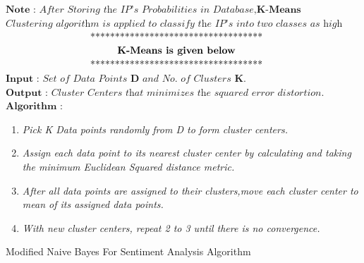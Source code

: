 \documentclass{article}
\begin{document}
\begin{algorithm}[H]
\begin{algorithmic}[1]
\State $\textbf{Note : }\textit{After Storing the IP's Probabilities in Database,}\textbf{K-Means} $ $\textit{Clustering algorithm is applied to classify the IP's into two classes as high and Low.}$
 $\centerline{***********************************}$
 $\textbf{\centerline{K-Means is given below}}$
 $\centerline{***********************************}$
\State $\textbf{Input : }\textit{Set of Data Points }\textbf{D}\textit{ and No. of Clusters}\textbf{ K.}$
\State $\textbf{Output : }\textit{Cluster Centers that minimizes the squared error distortion.}$
\State $\textbf{Algorithm : }$
\begin{enumerate}
   \item \textit{Pick K Data points randomly from D to form cluster centers.}
   \item \textit{Assign each data point to its nearest cluster center by calculating and taking the minimum Euclidean Squared distance metric.}
   \item \textit{After all data points are assigned to their clusters,move each cluster center to mean of its assigned data points.}
   \item \textit{With new cluster centers, repeat 2 to 3 until there is no convergence.}
\end{enumerate}

\end{algorithmic}
\caption{Modified Naive Bayes For Sentiment Analysis Algorithm}
\end{algorithm}
\end{document}
